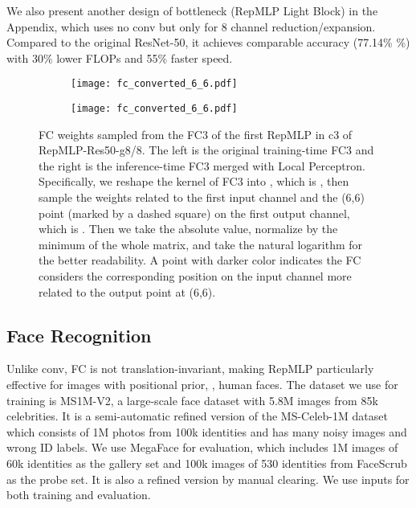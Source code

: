 \documentclass[10pt,twocolumn,letterpaper]{article}
\begin{document}
We also present another design of bottleneck (RepMLP Light Block) in the Appendix, which uses no  conv but only  for 8 channel reduction/expansion. Compared to the original ResNet-50, it achieves comparable accuracy (77.14\% \%) with 30\% lower FLOPs and 55\% faster speed.




\begin{figure}
	\begin{subfigure}{0.47\linewidth}
		\texttt{[image: fc\_converted\_6\_6.pdf]} 
	\end{subfigure}
	\begin{subfigure}{0.47\linewidth}
		\texttt{[image: fc\_converted\_6\_6.pdf]} 
	\end{subfigure}
	\vspace{-0.05in}
	\caption{FC weights sampled from the FC3 of the first RepMLP in c3 of RepMLP-Res50-g8/8. The left is the original training-time FC3 and the right is the inference-time FC3 merged with Local Perceptron. Specifically, we reshape the kernel of FC3 into , which is , then sample the weights related to the first input channel and the (6,6) point (marked by a dashed square) on the first output channel, which is . Then we take the absolute value, normalize by the minimum of the whole matrix, and take the natural logarithm for the better readability. A point with darker color indicates the FC considers the corresponding position on the input channel more related to the output point at (6,6).}
	\label{fig-visualized}
	\vskip -0.1in
\end{figure}

\subsection{Face Recognition}

Unlike conv, FC is not translation-invariant, making RepMLP particularly effective for images with positional prior, \ie, human faces. The dataset we use for training is MS1M-V2, a large-scale face dataset with 5.8M images from 85k celebrities. It is a semi-automatic refined version of the MS-Celeb-1M dataset \cite{guo2016ms} which consists of 1M photos from 100k identities and has many noisy images and wrong ID labels. We use MegaFace \cite{kemelmacher2016megaface} for evaluation, which includes 1M images of 60k identities as the gallery set and 100k images of 530 identities from FaceScrub as the probe set. It is also a refined version by manual clearing. We use  inputs for both training and evaluation.
\end{document}
